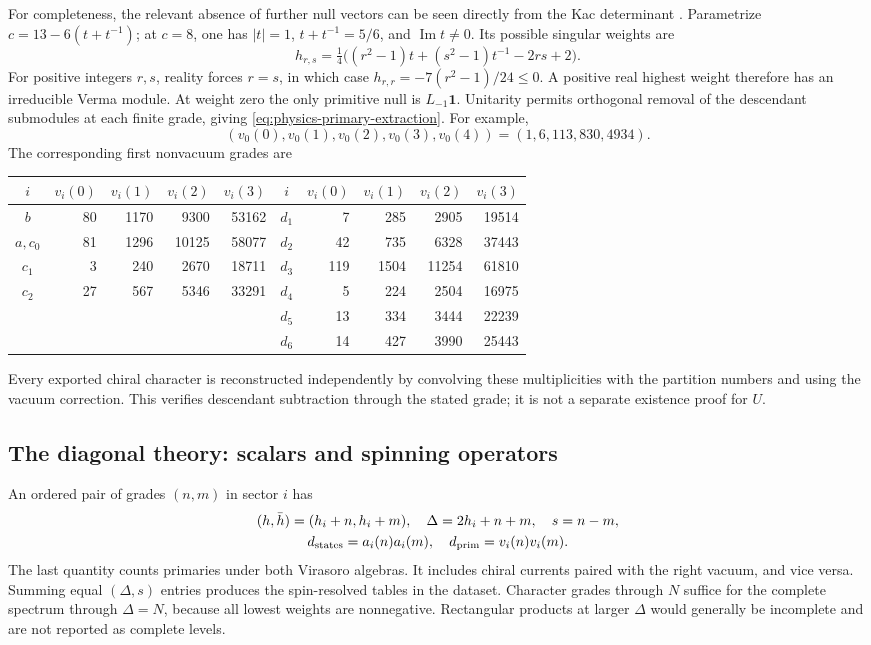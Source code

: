 For completeness, the relevant absence of further null vectors can
be seen directly from the Kac determinant
\cite[Lemmas~2--3]{LanglandsVir}.  Parametrize
$c=13-6(t+t^{-1})$; at $c=8$, one has $|t|=1$,
$t+t^{-1}=5/6$, and $\operatorname{Im}t\ne0$.  Its possible singular
weights are
\[
 h_{r,s}=\tfrac14\bigl((r^2-1)t+(s^2-1)t^{-1}-2rs+2\bigr).
\]
For positive integers $r,s$, reality forces $r=s$, in which case
$h_{r,r}=-7(r^2-1)/24\leq0$.  A positive real highest weight therefore
has an irreducible Verma module.  At weight zero the only primitive
null is $L_{-1}\mathbf1$.  Unitarity permits orthogonal removal of
the descendant submodules at each finite grade, giving
\eqref{eq:physics-primary-extraction}.  For example,
\[
 (v_0(0),v_0(1),v_0(2),v_0(3),v_0(4))
 =(1,6,113,830,4934).
\]
The corresponding first nonvacuum grades are
\begin{center}
\begin{tabular}{c|rrrr@{\qquad}c|rrrr}
 $i$&$v_i(0)$&$v_i(1)$&$v_i(2)$&$v_i(3)$&
 $i$&$v_i(0)$&$v_i(1)$&$v_i(2)$&$v_i(3)$\\\hline
 $b$&80&1170&9300&53162&$d_1$&7&285&2905&19514\\
 $a,c_0$&81&1296&10125&58077&$d_2$&42&735&6328&37443\\
 $c_1$&3&240&2670&18711&$d_3$&119&1504&11254&61810\\
 $c_2$&27&567&5346&33291&$d_4$&5&224&2504&16975\\
 &&&&&$d_5$&13&334&3444&22239\\
 &&&&&$d_6$&14&427&3990&25443
\end{tabular}
\end{center}
Every exported chiral character is reconstructed independently by
convolving these multiplicities with the partition numbers and using
the vacuum correction.  This verifies descendant subtraction through
the stated grade; it is not a separate existence proof for $U$.

\subsection{The diagonal theory: scalars and spinning operators}

An ordered pair of grades $(n,m)$ in sector $i$ has
\begin{equation}\label{eq:physics-spectrum-formula}
\begin{gathered}
 (h,\bar h)=(h_i+n,h_i+m),\quad
 \Delta=2h_i+n+m,\quad s=n-m,\\
 d_{\rm states}=a_i(n)a_i(m),\quad
 d_{\rm prim}=v_i(n)v_i(m).
\end{gathered}
\end{equation}
The last quantity counts primaries under both Virasoro algebras.
It includes chiral currents paired with the right vacuum, and vice
versa.  Summing equal $(\Delta,s)$ entries produces the spin-resolved
tables in the dataset.  Character grades through $N$ suffice for the
complete spectrum through $\Delta=N$, because all lowest weights
are nonnegative.  Rectangular products at larger $\Delta$ would
generally be incomplete and are not reported as complete levels.

